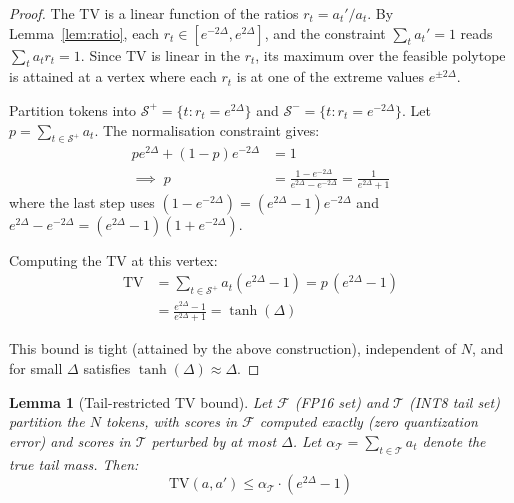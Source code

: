 \documentclass[10pt,twocolumn,a4paper]{article}
\newtheorem{lemma}[theorem]{Lemma}
\theoremstyle{definition}
\theoremstyle{remark}
\begin{document}
\begin{proof}
The TV is a linear function of the ratios $r_t = a_t'/a_t$.  By Lemma~\ref{lem:ratio}, each $r_t \in [e^{-2\Delta}, e^{2\Delta}]$, and the constraint $\sum_t a_t' = 1$ reads $\sum_t a_t r_t = 1$.  Since TV is linear in the $r_t$, its maximum over the feasible polytope is attained at a vertex where each $r_t$ is at one of the extreme values $e^{\pm 2\Delta}$.

Partition tokens into $\mathcal{S}^+ = \{t : r_t = e^{2\Delta}\}$ and $\mathcal{S}^- = \{t : r_t = e^{-2\Delta}\}$.  Let $p = \sum_{t \in \mathcal{S}^+} a_t$.  The normalisation constraint gives:
\begin{align*}
  p e^{2\Delta} + (1{-}p) e^{-2\Delta} &= 1 \\
  \implies\; p &= \frac{1 - e^{-2\Delta}}{e^{2\Delta} - e^{-2\Delta}} = \frac{1}{e^{2\Delta} + 1}
\end{align*}
where the last step uses $(1 - e^{-2\Delta}) = (e^{2\Delta}-1)e^{-2\Delta}$ and $e^{2\Delta} - e^{-2\Delta} = (e^{2\Delta}-1)(1+e^{-2\Delta})$.

Computing the TV at this vertex:
\begin{align*}
  \mathrm{TV}
  &= \sum_{t \in \mathcal{S}^+} a_t(e^{2\Delta} - 1)
   = p\,(e^{2\Delta} - 1) \\
  &= \frac{e^{2\Delta} - 1}{e^{2\Delta} + 1}
   = \tanh(\Delta)
\end{align*}

This bound is tight (attained by the above construction), independent of $N$, and for small $\Delta$ satisfies $\tanh(\Delta) \approx \Delta$.
\end{proof}

\begin{lemma}[Tail-restricted TV bound]
\label{lem:tail_tv}
Let $\mathcal{F}$ (FP16 set) and $\mathcal{T}$ (INT8 tail set) partition the $N$ tokens, with scores in $\mathcal{F}$ computed exactly (zero quantization error) and scores in $\mathcal{T}$ perturbed by at most $\Delta$.  Let $\alpha_{\mathcal{T}} = \sum_{t \in \mathcal{T}} a_t$ denote the true tail mass.  Then:
\[
  \mathrm{TV}(a, a') \leq \alpha_{\mathcal{T}} \cdot (e^{2\Delta} - 1)
\]
\end{lemma}
\end{document}
